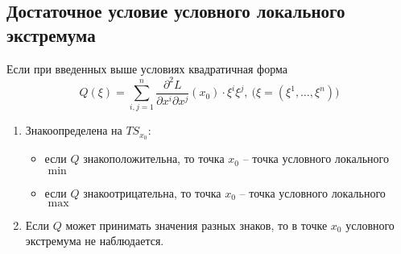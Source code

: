 \setcounter{subsection}{27}

\subsection{Достаточное условие условного локального экстремума}

\begin{theorem}
    Если при введенных выше условиях квадратичная форма
    \[
        Q(\xi) = \sum_{i,j=1}^{n}\frac{\partial^2 L}{\partial x^i \partial x^j}(x_0)\cdot\xi^i\xi^j,\ \big(\xi=(\xi^1,\ldots,\xi^n)\big)
    \]
    \begin{enumerate}
        \item Знакоопределена на $TS_{x_0}$:
              \begin{itemize}
                  \item если $Q$ знакоположительна, то точка $x_0$ -- точка условного локального $\min$
                  \item если $Q$ знакоотрицательна, то точка $x_0$ -- точка условного локального $\max$
              \end{itemize}
        \item Если $Q$ может принимать значения разных знаков, то в точке $x_0$ условного экстремума не наблюдается.
    \end{enumerate}
\end{theorem}

